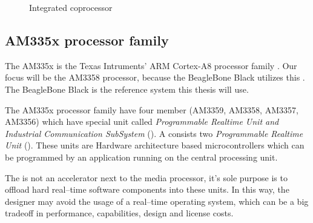 \begin{figure}[h]
	\centering
	\caption{Integrated coprocessor}
	\label{fig:int_controller_hw}
\end{figure}

\subsection{AM335x processor family}

The AM335x is the Texas Intruments' ARM Cortex-A8 processor family \citep{AM335x}. Our focus will be the AM3358 processor, because the BeagleBone Black \citep{BBB} utilizes this \cpu. The BeagleBone Black is the reference system this thesis will use.

The AM335x processor family have four member (AM3359, AM3358, AM3357, AM3356) which have special unit called \emph{Programmable Realtime Unit and Industrial Communication SubSystem} (\pruss). A \pruss consists two \emph{Programmable Realtime Unit} (\pru). These units are Hardware architecture based microcontrollers which can be programmed by an application running on the central processing unit.

The \pru is not an accelerator next to the media processor, it's sole purpose is to offload hard real--time software components into these units. In this way, the designer may avoid the usage of a real--time operating system, which can be a big tradeoff in performance, capabilities, design and license costs.

